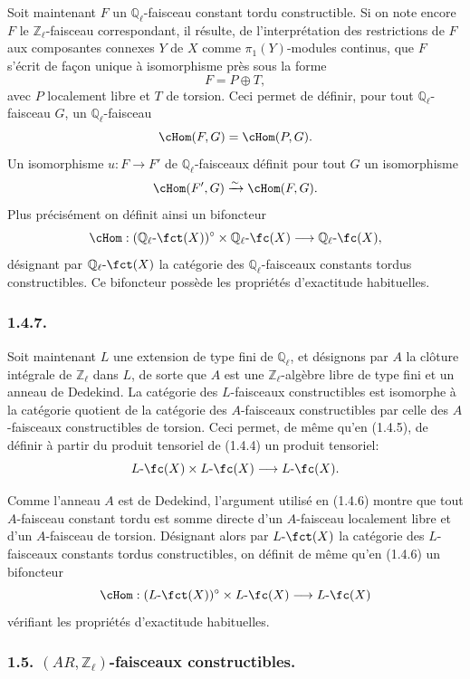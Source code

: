 Soit maintenant \(F\) un \(\mathbb{Q}_\ell\)-faisceau constant tordu constructible. Si on note encore \(F\) le \(\mathbb{Z}_\ell\)-faisceau correspondant, il résulte, de l'interprétation des restrictions de \(F\) aux composantes connexes \(Y\) de \(X\) comme \(\pi_1(Y)\)-modules continus, que \(F\) s'écrit de façon unique à isomorphisme près sous la forme
\[
F=P\oplus T,
\]
avec \(P\) localement libre et \(T\) de torsion. Ceci permet de définir, pour tout \(\mathbb{Q}_\ell\)-faisceau \(G\), un \(\mathbb{Q}_\ell\)-faisceau
\[
\cHom(F,G)=\cHom(P,G).
\]
Un isomorphisme \(u:F\to F'\) de \(\mathbb{Q}_\ell\)-faisceaux définit pour tout \(G\) un isomorphisme
\[
\cHom(F',G)\xrightarrow{\sim}\cHom(F,G).
\]
Plus précisément on définit ainsi un bifoncteur
\[
\cHom:(\mathbb{Q}_\ell\text{-}\fct(X))^\circ\times \mathbb{Q}_\ell\text{-}\fc(X)
\longrightarrow \mathbb{Q}_\ell\text{-}\fc(X),
\]
désignant par \(\mathbb{Q}_\ell\text{-}\fct(X)\) la catégorie des \(\mathbb{Q}_\ell\)-faisceaux constants tordus constructibles. Ce bifoncteur possède les propriétés d'exactitude habituelles.

\subsubsection*{1.4.7.}
Soit maintenant \(L\) une extension de type fini de \(\mathbb{Q}_\ell\), et désignons par \(A\) la clôture intégrale de \(\mathbb{Z}_\ell\) dans \(L\), de sorte que \(A\) est une \(\mathbb{Z}_\ell\)-algèbre libre de type fini et un anneau de Dedekind. La catégorie des \(L\)-faisceaux constructibles est isomorphe à la catégorie quotient de la catégorie des \(A\)-faisceaux constructibles par celle des \(A\)-faisceaux constructibles de torsion. Ceci permet, de même qu'en (1.4.5), de définir à partir du produit tensoriel de (1.4.4) un produit tensoriel:
\[
L\text{-}\fc(X)\times L\text{-}\fc(X)\longrightarrow L\text{-}\fc(X).
\]

Comme l'anneau \(A\) est de Dedekind, l'argument utilisé en (1.4.6) montre que tout \(A\)-faisceau constant tordu est somme directe d'un \(A\)-faisceau localement libre et d'un \(A\)-faisceau de torsion. Désignant alors par \(L\text{-}\fct(X)\) la catégorie des \(L\)-faisceaux constants tordus constructibles, on définit de même qu'en (1.4.6) un bifoncteur
\[
\cHom:(L\text{-}\fct(X))^\circ\times L\text{-}\fc(X)
\longrightarrow L\text{-}\fc(X)
\]
vérifiant les propriétés d'exactitude habituelles.

\subsubsection*{1.5. \((AR,\mathbb{Z}_\ell)\)-faisceaux constructibles.}

